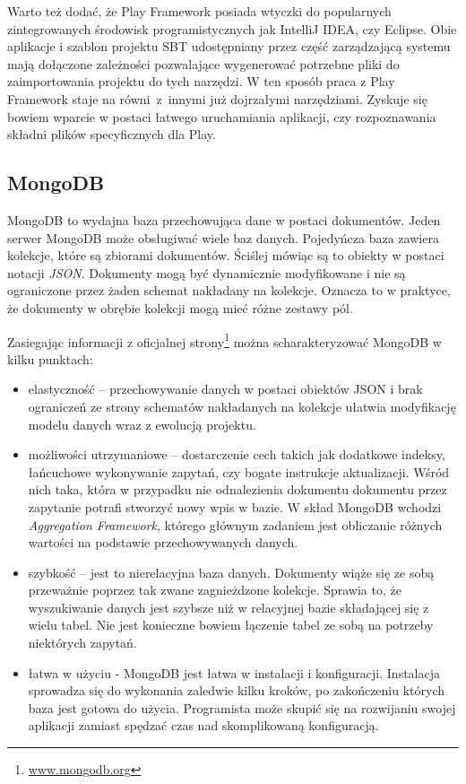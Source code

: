 \documentclass[wimgr]{xmgr}
\begin{document}
Warto też dodać, że Play Framework posiada wtyczki do popularnych zintegrowanych środowisk programistycznych jak IntelliJ IDEA, czy Eclipse. Obie aplikacje i szablon projektu SBT udostępniany przez część zarządzającą systemu mają dołączone zależności pozwalające wygenerować potrzebne pliki do zaimportowania projektu do tych narzędzi. W ten sposób praca z Play Framework staje na równi~z~innymi już dojrzałymi narzędziami. Zyskuje się bowiem wparcie w postaci łatwego uruchamiania aplikacji, czy rozpoznawania składni plików specyficznych dla Play.

\subsection{MongoDB}

MongoDB to wydajna baza przechowująca dane w postaci dokumentów. Jeden serwer MongoDB może obsługiwać wiele baz danych. Pojedyńcza baza zawiera kolekcje, które są zbiorami dokumentów. Ściślej mówiąc są to obiekty w postaci notacji \emph{JSON}. Dokumenty mogą być dynamicznie modyfikowane i nie są ograniczone przez żaden schemat nakładany na kolekcje. Oznacza to w praktyce, że dokumenty w obrębie kolekcji mogą mieć różne zestawy pól.

Zasiegając informacji z oficjalnej strony\footnote{\url{www.mongodb.org}} można scharakteryzować MongoDB w kilku punktach:

\begin{itemize}
\item elastyczność -- przechowywanie danych w postaci obiektów JSON i brak ograniczeń ze strony schematów nakładanych na kolekcje ułatwia modyfikację modelu danych wraz z ewolucją projektu.
\item możliwości utrzymaniowe -- dostarczenie cech takich jak dodatkowe indeksy, łańcuchowe wykonywanie zapytań, czy bogate instrukcje aktualizacji. Wśród nich taka, która w przypadku nie odnalezienia dokumentu dokumentu przez zapytanie potrafi stworzyć nowy wpis w bazie. W skład MongoDB wchodzi \emph{Aggregation Framework}, którego głównym zadaniem jest obliczanie różnych wartości na podstawie przechowywanych danych.
\item szybkość -- jest to nierelacyjna baza danych. Dokumenty wiąże się ze sobą przeważnie poprzez tak zwane zagnieżdzone kolekcje. Sprawia to, że wyszukiwanie danych jest szybsze niż w relacyjnej bazie składającej się z wielu tabel. Nie jest konieczne bowiem łączenie tabel ze sobą na potrzeby niektórych zapytań.
\item łatwa w użyciu - MongoDB jest łatwa w instalacji i konfiguracji. Instalacja sprowadza się do wykonania zaledwie kilku kroków, po zakończeniu których baza jest gotowa do użycia. Programista może skupić się na rozwijaniu swojej aplikacji zamiast spędzać czas nad skomplikowaną konfiguracją.
\end{itemize}
\end{document}
